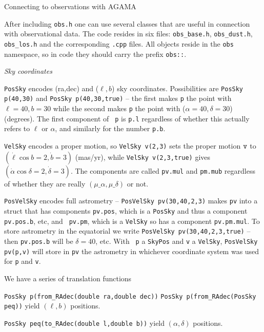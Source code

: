  \reportformat
\def\nwsec{\medskip\noindent}

\centerline{\titlefont Connecting to observations with AGAMA}

\bigskip\noindent After including {\tt obs.h} one can use several classes
that are useful in connection with observational data. The code resides in
six files: {\tt obs\_base.h}, {\tt obs\_dust.h}, {\tt obs\_los.h} and the
corresponding {\tt .cpp} files. All objects reside in the {\tt obs}
namespace, so in code they should carry the prefix {\tt obs::}.

\centerline{\it Sky coordinates}

\nwsec
{\tt PosSky} encodes (ra,dec) and ($\ell,b$) sky coordinates.
Possibilities 
are
{\tt PosSky p(40,30)} and {\tt PosSky p(40,30,true)} -- the first
makes {\tt p} the point with $\ell=40, b=30$ while the second makes {\tt p}
the point with ($\alpha=40,\delta=30$) (degrees). The first component of {\tt
p} is {\tt p.l} regardless of whether this actually refers to $\ell$ or
$\alpha$, and similarly for the number {\tt p.b}.

\nwsec 
{\tt VelSky} encodes a proper motion, so {\tt VelSky v(2,3)} sets the
proper motion  $\tt
v$ to $(\dot\ell\cos b=2,\dot b=3)$ (mas/yr), while {\tt VelSky
v(2,3,true)} gives $(\dot\alpha\cos\delta=2,\dot\delta=3)$. The
components are called {\tt pv.mul} and {\tt pm.mub} regardless of whether
they are really $(\mu\_\alpha,\mu\_\delta)$ or not.

\nwsec
{\tt PosVelSky} encodes full astrometry -- {\tt PosVelSky pv(30,40,2,3)}
makes {\tt pv} into a struct that has components {\tt pv.pos}, which is a
{\tt PosSky} and thus a component {\tt pv.pos.b}, etc,  and {\tt
pv.pm}, which is a {\tt VelSky} so has a component {\tt pv.pm.mul}. To store
astrometry in the equatorial we write  {\tt PosVelSky
pv(30,40,2,3,true)} -- then {\tt pv.pos.b} will be $\delta=40$, etc. With {\tt
p} a {\tt SkyPos}  and {\tt v} a {\tt VelSky}, {\tt PosVelSky pv(p,v)}
will store in {\tt pv} the astrometry in whichever coordinate system was used
for {\tt p} and {\tt v}.

\nwsec
We have a series of translation functions

\nwsec
{\tt PosSky p(from\_RAdec(double ra,double dec))}\quad
{\tt PosSky p(from\_RAdec(PosSky peq))} yield $(\ell,b)$ positions.

\nwsec
{\tt PosSky peq(to\_RAdec(double l,double b))} yield $(\alpha,\delta)$ positions.

